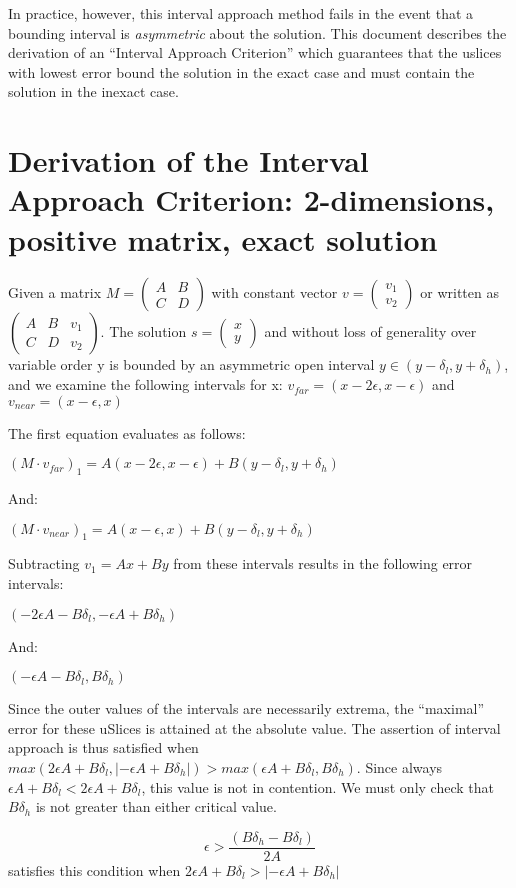 \documentclass[a4paper,10pt]{article}
\begin{document}
In practice, however, this interval approach method fails in the event that a bounding interval
is \emph{asymmetric} about the solution.  This document describes the derivation of an ``Interval
Approach Criterion'' which guarantees that the uslices with lowest error bound the solution in
the exact case and must contain the solution in the inexact case.

\section{Derivation of the Interval Approach Criterion: 2-dimensions, positive matrix, exact solution}

Given a matrix $ M = \left( \begin{array}{cc} A & B \\ C & D \end{array} \right)$ with constant
vector $v = \left( \begin{array}{c} v_1 \\ v_2 \end{array} \right)$ or written as            
$\left( \begin{array}{cc|c} A & B & v_1 \\ C & D & v_2 \end{array} \right)$.  The solution
$s = \left( \begin{array}{c} x \\ y \end{array} \right)$ and without loss of generality 
over variable order y is bounded by an asymmetric open interval $y \in (y - \delta_l, y + \delta_h)$,
and we examine the following intervals for x: $v_{far} = (x - 2\epsilon, x - \epsilon)$ and 
$v_{near} = (x - \epsilon, x)$

The first equation evaluates as follows:

$(M \cdot v_{far})_1 = A(x - 2\epsilon, x - \epsilon) + B(y - \delta_l, y + \delta_h)$

And:

$(M \cdot v_{near})_1 = A(x - \epsilon, x) + B(y - \delta_l, y + \delta_h)$

Subtracting $v_1 = Ax + By$ from these intervals results in the following error intervals:

$(-2\epsilon A - B\delta_l, -\epsilon A + B\delta_h)$

And:

$(-\epsilon A - B\delta_l, B\delta_h)$


Since the outer values of the intervals are necessarily extrema, the ``maximal'' error for these
uSlices is attained at the absolute value.  The assertion of interval approach is thus satisfied 
when $max(2\epsilon A + B\delta_l, |-\epsilon A + B\delta_h|) > max(\epsilon A + B\delta_l, B\delta_h)$.
Since always $\epsilon A + B\delta_l < 2\epsilon A + B\delta_l$, this value is not in contention.
We must only check that $B\delta_h$ is not greater than either critical value.

\[\epsilon > \frac{(B\delta_h - B\delta_l)}{2A}\] satisfies this condition when $2\epsilon A + B\delta_l > |-\epsilon A + B\delta_h|$
\end{document}
